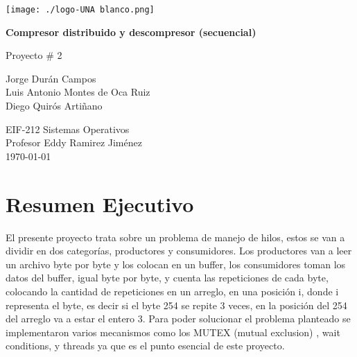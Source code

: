 \documentclass[12pt, article, natbib]{IEEEtran}
\begin{document}
\begin{titlepage}
	\texttt{[image: ./logo-UNA blanco.png]}      
   	\begin{changemargin}{4.5cm}{0cm}
       	\textbf{\Huge Compresor distribuido y descompresor (secuencial)}

       	\vspace{0.2cm}
       	\LARGE Proyecto \# 2
            
       	\vspace{3cm}
		\Large
       	Jorge Durán Campos \\ 
       	Luis Antonio Montes de Oca Ruiz \\ 
       	Diego Quirós Artiñano \\ 

       	\vspace{3cm}
       
		EIF-212 Sistemas Operativos \\
       	Profesor Eddy Ramirez Jiménez \\
		       	
       	\vspace{3cm}
       	\today
	\end{changemargin}
\end{titlepage}

\onecolumn
    \renewcommand{\contentsname}{\large Índice \\ \hrulefill}
\tableofcontents
\setcounter{tocdepth}{2}
\newpage
\section{Resumen Ejecutivo}
El presente proyecto trata sobre un problema de manejo de hilos, estos se van a dividir en dos categorías, productores y consumidores. Los productores van a leer un archivo byte por byte y los colocan en un buffer, los consumidores toman los datos del buffer, igual byte por byte, y cuenta las repeticiones de cada byte, colocando la cantidad de repeticiones en un arreglo, en una posición i, donde i representa el byte, es decir si el byte 254 se repite 3 veces, en la posición del 254 del arreglo va a estar el entero 3. Para poder solucionar el problema planteado se implementaron varios mecanismos como los MUTEX (mutual exclusion) \cite{whiletruethendream_2020_mutex}, wait conditions, y threads ya que es el punto esencial de este proyecto.\cite{threadsInCEducative} \cite{codevault_2020_short} \cite{portfoliocourses_2022_introduction} \cite{whiletruethendream_2018_programar}\\
\end{document}
